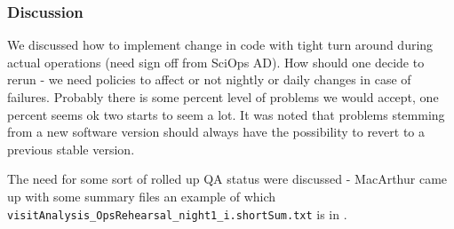 \subsubsection{Discussion}
We discussed how to implement change in code with tight turn around during actual operations (need sign off from SciOps \gls{AD}).
How should one decide to rerun -  we need policies to affect or not nightly or daily changes in case of failures. Probably there is some percent level of problems we would accept, one percent seems ok two starts to seem a lot.  It was noted that problems stemming from a new software version should always have the possibility to revert to a previous stable version.

The need for some sort of rolled up \gls{QA} status were discussed - MacArthur came up with some summary files an example of which \texttt{visitAnalysis\_OpsRehearsal\_night1\_i.shortSum.txt} is in .